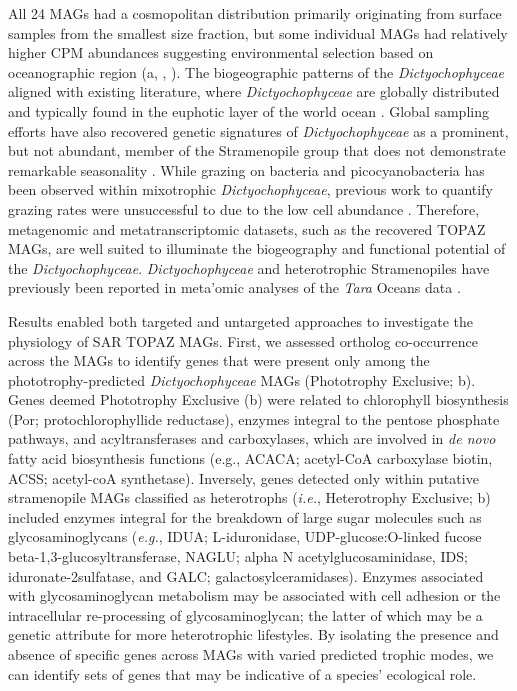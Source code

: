 \documentclass[12pt]{article}
\numberwithin{equation}{section}
\begin{document}
All 24 MAGs had a cosmopolitan distribution primarily originating from surface samples from the smallest size fraction, but some individual MAGs had relatively higher CPM abundances suggesting environmental selection based on oceanographic region (a, , ). The biogeographic patterns of the \textit{Dictyochophyceae} aligned with existing literature, where \textit{Dictyochophyceae} are globally distributed and typically found in the euphotic layer of the world ocean \citep{vaulot2008fmr, obiol2020mer, massana2011arm}. Global sampling efforts have also recovered genetic signatures of \textit{Dictyochophyceae} as a prominent, but not abundant, member of the Stramenopile group that does not demonstrate remarkable seasonality \citep{giner2019me, obiol2020mer}. While grazing on bacteria and picocyanobacteria has been observed within mixotrophic \textit{Dictyochophyceae}, previous work to quantify grazing rates were unsuccessful to due to the low cell abundance \citep{unrein2014ij}. Therefore, metagenomic and metatranscriptomic datasets, such as the recovered TOPAZ MAGs, are well suited to illuminate the biogeography and functional potential of the \textit{Dictyochophyceae}. \textit{Dictyochophyceae} and heterotrophic Stramenopiles have previously been reported in meta’omic analyses of the \textit{Tara} Oceans data \citep{Carradec2018global, pierellakarlusich2020arms, vorobev2020gra, sieracki2019sr}.

Results enabled both targeted and untargeted approaches to investigate the physiology of SAR TOPAZ MAGs. First, we assessed ortholog co-occurrence across the MAGs to identify genes that were present only among the phototrophy-predicted \textit{Dictyochophyceae} MAGs (Phototrophy Exclusive; b). Genes deemed Phototrophy Exclusive (b) were related to chlorophyll biosynthesis (Por; protochlorophyllide reductase), enzymes integral to the pentose phosphate pathways, and acyltransferases and carboxylases, which are involved in \textit{de novo} fatty acid biosynthesis functions (e.g., ACACA; acetyl-CoA carboxylase biotin, ACSS; acetyl-coA synthetase). Inversely, genes detected only within putative stramenopile MAGs classified as heterotrophs (\textit{i.e.}, Heterotrophy Exclusive;  b) included enzymes integral for the breakdown of large sugar molecules such as glycosaminoglycans (\textit{e.g.}, IDUA; L-iduronidase, UDP-glucose:O-linked fucose beta-1,3-glucosyltransferase, NAGLU; alpha N acetylglucosaminidase, IDS; iduronate-2sulfatase, and GALC; galactosylceramidases). Enzymes associated with glycosaminoglycan metabolism may be associated with cell adhesion or the intracellular re-processing of glycosaminoglycan; the latter of which may be a genetic attribute for more heterotrophic lifestyles. By isolating the presence and absence of specific genes across MAGs with varied predicted trophic modes, we can identify sets of genes that may be indicative of a species' ecological role. 
\end{document}
